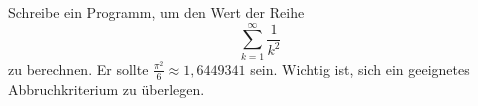 \begin{aufg}
Schreibe ein Programm, um den Wert der Reihe
\[ \sum_{k = 1}^\infty \frac{1}{k^2} \]
zu berechnen. Er sollte $\frac{\pi^2}{6}\approx 1,6449341$ sein. Wichtig ist, sich ein geeignetes Abbruchkriterium zu überlegen.
\end{aufg}